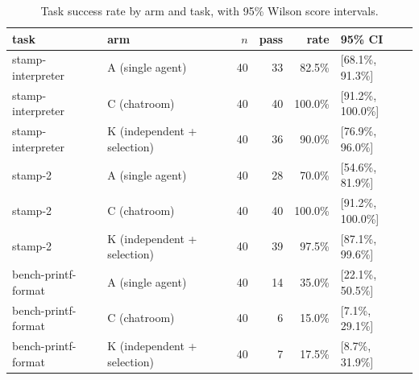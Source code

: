 \begin{table}[t]
\centering
\caption{Task success rate by arm and task, with 95\% Wilson score intervals.}
\label{tab:pass-rate}
\begin{tabular}{llrrrl}
\toprule
task & arm & $n$ & pass & rate & 95\% CI \\
\midrule
stamp-interpreter & A (single agent) & 40 & 33 & 82.5\% & [68.1\%, 91.3\%] \\
stamp-interpreter & C (chatroom) & 40 & 40 & 100.0\% & [91.2\%, 100.0\%] \\
stamp-interpreter & K (independent + selection) & 40 & 36 & 90.0\% & [76.9\%, 96.0\%] \\
stamp-2 & A (single agent) & 40 & 28 & 70.0\% & [54.6\%, 81.9\%] \\
stamp-2 & C (chatroom) & 40 & 40 & 100.0\% & [91.2\%, 100.0\%] \\
stamp-2 & K (independent + selection) & 40 & 39 & 97.5\% & [87.1\%, 99.6\%] \\
bench-printf-format & A (single agent) & 40 & 14 & 35.0\% & [22.1\%, 50.5\%] \\
bench-printf-format & C (chatroom) & 40 & 6 & 15.0\% & [7.1\%, 29.1\%] \\
bench-printf-format & K (independent + selection) & 40 & 7 & 17.5\% & [8.7\%, 31.9\%] \\
\bottomrule
\end{tabular}
\end{table}
